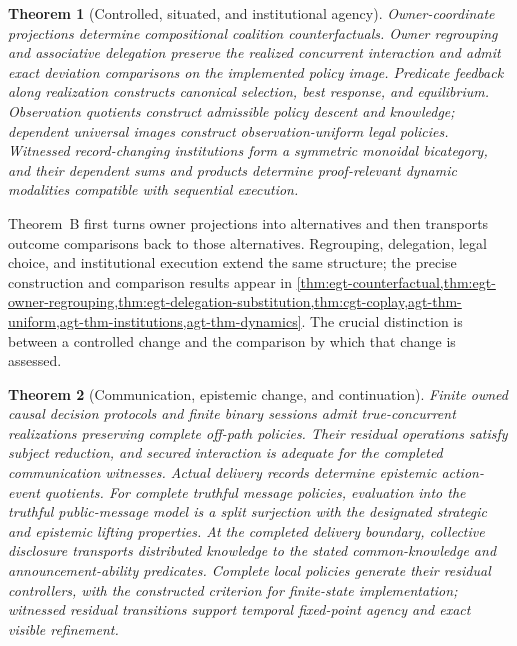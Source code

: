 \documentclass[11pt,a4paper]{article}
\numberwithin{equation}{section}
\theoremstyle{definition}
\theoremstyle{remark}
\theoremstyle{plain}
\newtheorem{maintheorem}{Theorem}
\begin{document}
\begin{maintheorem}[Controlled, situated, and institutional agency]
\label{main:B}
Owner-coordinate projections determine compositional coalition
counterfactuals.  Owner regrouping and associative delegation preserve the
realized concurrent interaction and admit exact deviation comparisons on
the implemented policy image.  Predicate feedback along realization
constructs canonical selection, best response, and equilibrium.
Observation quotients construct admissible policy descent and knowledge;
dependent universal images construct observation-uniform legal policies.
Witnessed record-changing institutions form a symmetric monoidal bicategory,
and their dependent sums and products determine proof-relevant dynamic
modalities compatible with sequential execution.
\end{maintheorem}

Theorem~B first turns owner projections into alternatives and then
transports outcome comparisons back to those alternatives. Regrouping,
delegation, legal choice, and institutional execution extend the same
structure; the precise construction and comparison results appear in
\cref{thm:egt-counterfactual,thm:egt-owner-regrouping,thm:egt-delegation-substitution,thm:cgt-coplay,agt-thm-uniform,agt-thm-institutions,agt-thm-dynamics}.
The crucial distinction is between a controlled change and the comparison
by which that change is assessed.

\begin{maintheorem}[Communication, epistemic change, and continuation]
\label{main:C}
Finite owned causal decision protocols and finite binary sessions admit
true-concurrent realizations preserving complete off-path policies.
Their residual operations satisfy subject reduction, and secured interaction
is adequate for the completed communication witnesses.  Actual delivery
records determine epistemic action-event quotients.  For complete truthful
message policies, evaluation into the truthful public-message model is a
split surjection with the designated strategic and epistemic lifting
properties.  At the completed delivery boundary, collective disclosure
transports distributed knowledge to the stated common-knowledge and
announcement-ability predicates.  Complete local policies generate their
residual controllers, with the constructed criterion for finite-state
implementation; witnessed residual transitions support temporal fixed-point
agency and exact visible refinement.
\end{maintheorem}
\end{document}
